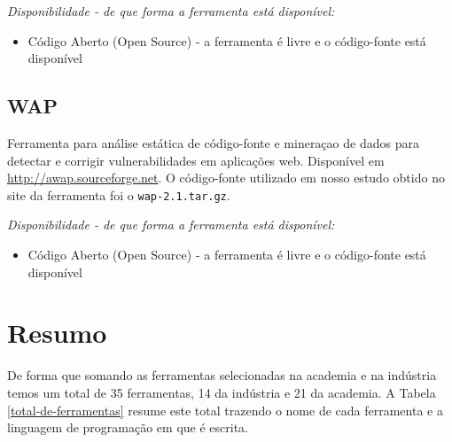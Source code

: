 \begin{description}

  \item {\it Disponibilidade - de que forma a ferramenta está disponível:}
    \begin{itemize}
      \item Código Aberto (Open Source) - a ferramenta é livre e o código-fonte está disponível
    \end{itemize}

\end{description}

\clearpage

\subsection{WAP}

Ferramenta para análise estática de código-fonte e mineraçao de dados para
detectar e corrigir vulnerabilidades em aplicações web. Disponível em
\url{http://awap.sourceforge.net}. O código-fonte utilizado em nosso estudo
obtido no site da ferramenta foi o \texttt{wap-2.1.tar.gz}.

\begin{description}

  \item {\it Disponibilidade - de que forma a ferramenta está disponível:}
    \begin{itemize}
      \item Código Aberto (Open Source) - a ferramenta é livre e o código-fonte está disponível
    \end{itemize}

\end{description}

\section{Resumo}

De forma que somando as ferramentas selecionadas na academia e na indústria
temos um total de 35 ferramentas, 14 da indústria e 21 da academia.  A
Tabela \ref{total-de-ferramentas} resume este total trazendo o nome de cada
ferramenta e a linguagem de programação em que é escrita.

